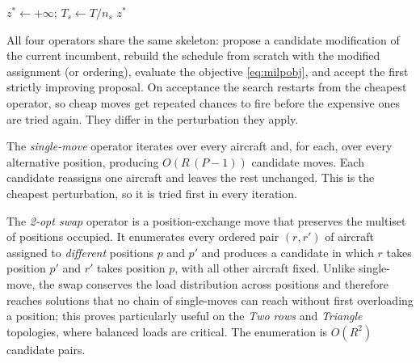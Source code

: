 \begin{algorithm}[htbp]
\DontPrintSemicolon
{}
$z^* \leftarrow +\infty$; $T_s \leftarrow T / n_s$\;
\Return $z^*$\;
\caption{Topology-aware GRASP with multi-start ($n_s$ restarts).}
\label{alg:topo}
\end{algorithm}

All four operators share the same skeleton: propose a candidate
modification of the current incumbent, rebuild the schedule from
scratch with the modified assignment (or ordering), evaluate the
objective \eqref{eq:milpobj}, and accept the first strictly improving
proposal.  On acceptance the search restarts from the cheapest
operator, so cheap moves get repeated chances to fire before the
expensive ones are tried again.  They differ in the perturbation they
apply.

The \emph{single-move} operator iterates over every aircraft and, for
each, over every alternative position, producing $O(R\,(P-1))$
candidate moves.  Each candidate reassigns one aircraft and leaves the
rest unchanged.  This is the cheapest perturbation, so it is tried
first in every iteration.

The \emph{2-opt swap} operator is a position-exchange move that
preserves the multiset of positions occupied.  It enumerates every
ordered pair $(r, r')$ of aircraft assigned to \emph{different}
positions $p$ and $p'$ and produces a candidate in which $r$ takes
position $p'$ and $r'$ takes position $p$, with all other aircraft
fixed.  Unlike single-move, the swap conserves the load distribution
across positions and therefore reaches solutions that no chain of
single-moves can reach without first overloading a position; this
proves particularly useful on the \emph{Two rows} and \emph{Triangle}
topologies, where balanced loads are critical.  The enumeration is
$O(R^2)$ candidate pairs.

